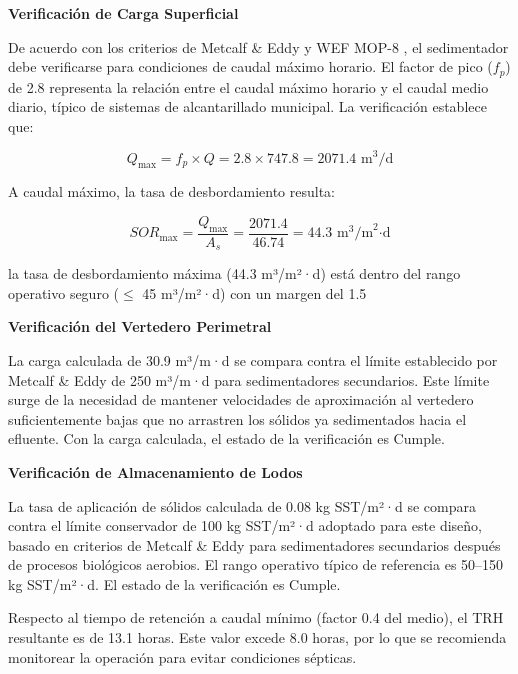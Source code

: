 \documentclass[12pt,a4paper]{article}
\begin{document}
\textbf{Verificación de Carga Superficial}

De acuerdo con los criterios de Metcalf \& Eddy \cite{metcalf2014} y WEF MOP-8 \cite{wef_mop8_2010}, el sedimentador debe verificarse para condiciones de caudal máximo horario. El factor de pico ($f_p$) de 2.8 representa la relación entre el caudal máximo horario y el caudal medio diario, típico de sistemas de alcantarillado municipal. La verificación establece que:

\begin{equation}
Q_{\max} = f_p \times Q = 2.8 \times 747.8 = 2071.4 \text{ m}^3\text{/d}
\end{equation}

A caudal máximo, la tasa de desbordamiento resulta:

\begin{equation}
SOR_{\max} = \frac{Q_{\max}}{A_s} = \frac{2071.4}{46.74} = 44.3 \text{ m}^3\text{/m}^2\text{·d}
\end{equation}

la tasa de desbordamiento máxima (44.3 m³/m²·d) está dentro del rango operativo seguro ($\leq$ 45 m³/m²·d) con un margen del 1.5%

\textbf{Verificación del Vertedero Perimetral}

La carga calculada de 30.9 m³/m·d se compara contra el límite establecido por Metcalf & Eddy de 250 m³/m·d para sedimentadores secundarios. Este límite surge de la necesidad de mantener velocidades de aproximación al vertedero suficientemente bajas que no arrastren los sólidos ya sedimentados hacia el efluente. Con la carga calculada, el estado de la verificación es Cumple.

\textbf{Verificación de Almacenamiento de Lodos}

La tasa de aplicación de sólidos calculada de 0.08 kg SST/m²·d se compara contra el límite conservador de 100 kg SST/m²·d adoptado para este diseño, basado en criterios de Metcalf & Eddy para sedimentadores secundarios después de procesos biológicos aerobios. El rango operativo típico de referencia es 50--150 kg SST/m²·d. El estado de la verificación es Cumple.

Respecto al tiempo de retención a caudal mínimo (factor 0.4 del medio), el TRH resultante es de 13.1 horas. Este valor excede 8.0 horas, por lo que se recomienda monitorear la operación para evitar condiciones sépticas.
\end{document}
